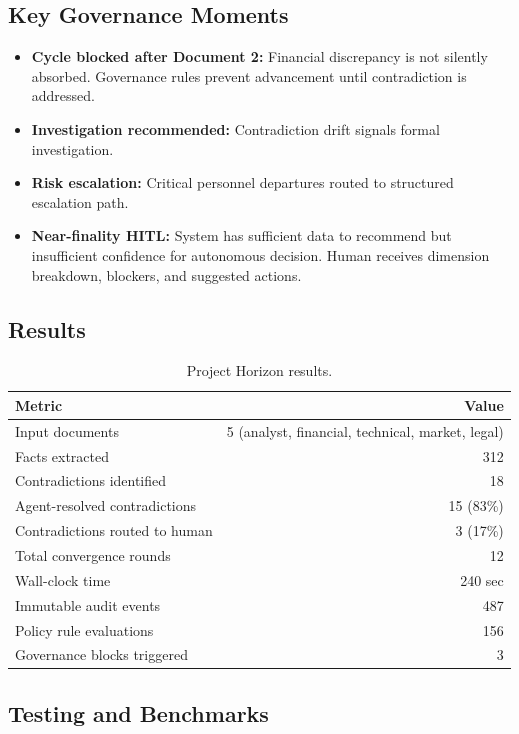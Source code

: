\documentclass[11pt]{article}
\begin{document}
\subsection{Key Governance Moments}

\begin{itemize}
  \item \textbf{Cycle blocked after Document 2:} Financial discrepancy is not silently absorbed. Governance rules prevent advancement until contradiction is addressed.
  \item \textbf{Investigation recommended:} Contradiction drift signals formal investigation.
  \item \textbf{Risk escalation:} Critical personnel departures routed to structured escalation path.
  \item \textbf{Near-finality HITL:} System has sufficient data to recommend but insufficient confidence for autonomous decision. Human receives dimension breakdown, blockers, and suggested actions.
\end{itemize}

\subsection{Results}

\begin{table}[H]
\centering
\begin{tabular}{lr}
\toprule
\textbf{Metric} & \textbf{Value} \\
\midrule
Input documents & 5 (analyst, financial, technical, market, legal) \\
Facts extracted & 312 \\
Contradictions identified & 18 \\
Agent-resolved contradictions & 15 (83\%) \\
Contradictions routed to human & 3 (17\%) \\
Total convergence rounds & 12 \\
Wall-clock time & 240 sec \\
Immutable audit events & 487 \\
Policy rule evaluations & 156 \\
Governance blocks triggered & 3 \\
\bottomrule
\end{tabular}
\caption{Project Horizon results.}
\label{tab:horizon}
\end{table}

\subsection{Testing and Benchmarks}
\end{document}
